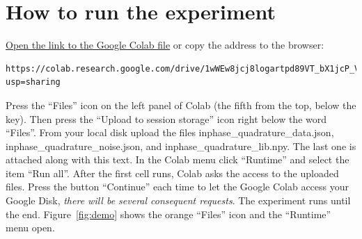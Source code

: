 \documentclass[12pt]{article}
\begin{document}
\section{How to run the experiment}\label{sec:experiment}
\href{https://colab.research.google.com/drive/1wWEw8jcj8logartpd89VT_bX1jcP_VBb?usp=sharing}{Open the link to the Google Colab file} or copy the address to the browser:
{\footnotesize
\begin{verbatim}https://colab.research.google.com/drive/1wWEw8jcj8logartpd89VT_bX1jcP_VBb?usp=sharing\end{verbatim}}
\noindent
Press the ``Files'' icon on the left panel of Colab (the fifth from the top, below the key). Then press the ``Upload to session storage'' icon right below the word ``Files''.  From your local disk upload the files \textsf{inphase\_quadrature\_data.json}, \textsf{inphase\_quadrature\_noise.json}, and \textsf{inphase\_quadrature\_lib.npy}. The last one is attached along with this text. In the Colab menu click ``Runtime'' and select the item ``Run all''. After the first cell runs, Colab asks the access to the uploaded files. Press the button ``Continue'' each time to let the Google Colab access your Google Disk, \emph{there will be several consequent requests}. The experiment runs until the end. Figure~\ref{fig:demo} shows the orange ``Files'' icon and the ``Runtime'' menu open.\sloppy{}



\end{document}
